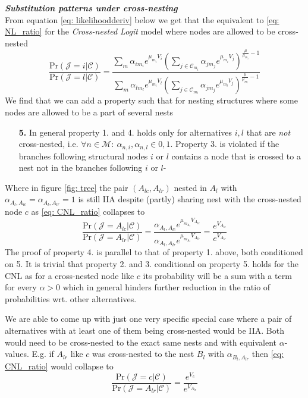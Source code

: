 \\ \\
\textbf{\textit{Substitution patterns under cross-nesting}}\\
From equation \eqref{eq: likelihoodderiv} below we get that the equivalent to \eqref{eq: NL_ratio} for the \textit{Cross-nested Logit} model where nodes are allowed to be cross-nested
\begin{equation} \label{eq: CNL_ratio}
  \frac{\textrm{Pr}(\mathcal{J}=i|\mathcal{C})}
    {\textrm{Pr}(\mathcal{J}=l|\mathcal{C})}
  =\frac{\sum_m\alpha_{im_i}e^{\mu_{m_i} V_i}
    \left(\sum\limits_{j\in\mathcal{C}_{m_i} }\alpha_{jm_j}e^{\mu_{m_i} V_j}\right)
    ^{\frac{\mu}{\mu_{m_i} }-1}  }
  {\sum_m\alpha_{lm_l}e^{\mu_{m_l} V_l}
    \left(\sum\limits_{j\in\mathcal{C}_{m_l} }\alpha_{jm_j}e^{\mu_{m_l} V_j}  \right)
    ^{\frac{\mu}{\mu_{m_l} }-1}  }
\end{equation}
We find that we can add a  property such that for nesting structures where some nodes are allowed to be a part of several nests
\begin{itemize}
  \item[\textbf{5.}] In general property 1. and 4. holds only for alternatives $i,l$ that are \textit{not} cross-nested, i.e. $\forall n\in\mathcal{M}:\ \alpha_{n,i},\alpha_{n,l}\in0,1$. Property 3. is violated if the branches following structural nodes $i$ or $l$ contains a node that is crossed to a nest not in the branches following $i$ or $l$-
\end{itemize}
Where in figure \ref{fig: tree} the pair $(A_{lc},A_{lr})$ nested in $A_l$ with $\alpha_{A_l,A_{lc}}=\alpha_{A_l,A_{lr}}=1$ is still IIA despite (partly) sharing nest with the cross-nested node $c$ as \eqref{eq: CNL_ratio} collapses to
\begin{equation} \label{eq: CNL_ratio}
  \frac{\textrm{Pr}(\mathcal{J}=A_{lc}|\mathcal{C})}
    {\textrm{Pr}(\mathcal{J}=A_{lr}|\mathcal{C})}
    =\frac{\alpha_{A_l,A_{lc}}e^{\mu_{m_{A_{l}}} V_{A_{lc}}}  }
      {\alpha_{A_l,A_{lr}}e^{\mu_{m_{A_{l}}} V_{A_{lr}}}  }
    =\frac{e^{V_{A_{lc}}}  }
        {e^{V_{A_{lr}}}  }
\end{equation}
The proof of property 4. is parallel to that of property 1. above, both conditioned on 5. It is trivial that property 2. and 3. conditional on property 5. holds for the CNL as for a cross-nested node like $c$ its probability will be a sum with a term for every $\alpha>0$ which in general hinders further reduction in the ratio of probabilities wrt. other alternatives.

We are able to come up with just one very specific special case where a pair of alternatives with at least one of them being cross-nested would be IIA. Both would need to be cross-nested to the exact same nests and with equivalent $\alpha$-values. E.g. if $A_{lr}$ like $c$ was cross-nested to the nest $B_l$ with $\alpha_{B_l,A_{lr}}$ then \eqref{eq: CNL_ratio} would collapse to
\begin{equation} \label{eq: CNL_ratio}
  \frac{\textrm{Pr}(\mathcal{J}=c|\mathcal{C})}
    {\textrm{Pr}(\mathcal{J}=A_{lr}|\mathcal{C})}
    =\frac{e^{V_{c}}  }
        {e^{V_{A_{lr}}}  }
\end{equation}

